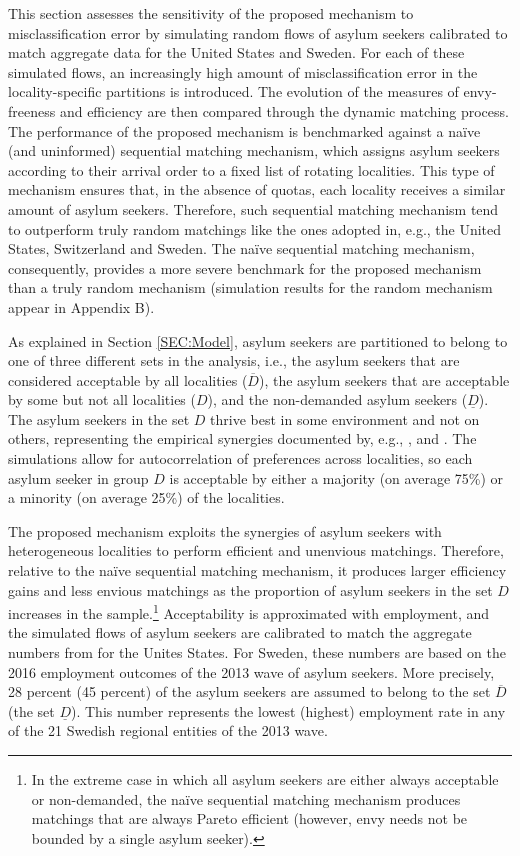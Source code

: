 \documentclass[12pt,fleqn]{article}
\begin{document}
This section assesses the sensitivity of the proposed mechanism to misclassification error by simulating random flows of asylum seekers calibrated to match aggregate data for the United States and Sweden. For each of these simulated flows, an increasingly high amount of misclassification error in the locality-specific partitions is introduced. The evolution of the measures of envy-freeness and efficiency are then compared through the dynamic matching process. The performance of the proposed mechanism is benchmarked against a na\"{i}ve (and uninformed) sequential matching mechanism, which assigns asylum seekers according to their arrival order to a fixed list of rotating localities. This type of mechanism ensures that, in the absence of quotas, each locality receives a similar amount of asylum seekers. Therefore, such sequential matching mechanism tend to outperform truly random matchings like the ones adopted in, e.g., the United States, Switzerland and Sweden. The na\"{i}ve sequential matching mechanism, consequently, provides a more severe benchmark for the proposed mechanism than a truly random mechanism (simulation results for the random mechanism appear in Appendix B).

As explained in Section \ref{SEC:Model}, asylum seekers are partitioned to belong to one of three different sets in the analysis, i.e., the asylum seekers that are considered acceptable by all localities ($\overline{D}$), the asylum seekers that are acceptable by some but not all localities ($D$), and the non-demanded asylum seekers ($\underline{D}$). The asylum seekers in the set $D$ thrive best in some environment and not on others, representing the empirical synergies documented by, e.g., \cite{bib:BansakEtAl}, \citet{bib:Damm} and \citet{bib:EdinEtAl}. The simulations allow for autocorrelation of preferences across localities, so each asylum seeker in group $D$ is acceptable by either a majority (on average 75\%) or a minority (on average 25\%) of the localities.

The proposed mechanism exploits the synergies of asylum seekers with heterogeneous localities to perform efficient and unenvious matchings. Therefore, relative to the na\"{i}ve sequential matching mechanism, it produces larger efficiency gains and less envious matchings as the proportion of asylum seekers in the set $D$ increases in the sample.\footnote{In the extreme case in which all asylum seekers are either always acceptable or non-demanded, the na\"{i}ve sequential matching mechanism produces matchings that are always Pareto efficient (however, envy needs not be bounded by a single asylum seeker).} Acceptability is approximated with employment, and the simulated flows of asylum seekers are calibrated to match the aggregate numbers from \cite{bib:BansakEtAl} for the Unites States. For Sweden, these numbers are based on the 2016 employment outcomes of the 2013 wave of asylum seekers. More precisely, 28 percent (45 percent) of the asylum seekers are assumed to belong to the set $\overline{D}$ (the set $\underline{D}$). This number represents the lowest (highest) employment rate in any of the 21 Swedish regional entities of the 2013 wave.
\end{document}
